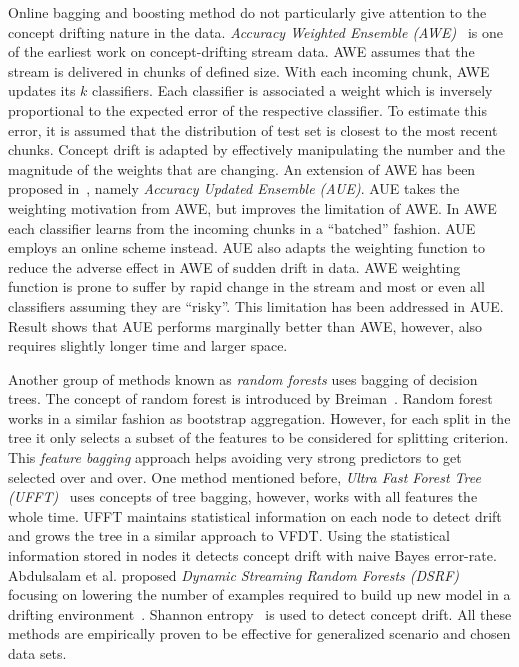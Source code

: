 
Online bagging and boosting method do not particularly give attention to the concept drifting nature in the data. \textit{Accuracy Weighted Ensemble (AWE)}~\cite{wang03:accuweighted} is one of the earliest work on concept-drifting stream data. AWE assumes that the stream is delivered in chunks of defined size. With each incoming chunk, AWE updates its $k$ classifiers. Each classifier is associated a weight which is inversely proportional to the expected error of the respective classifier. To estimate this error, it is assumed that the distribution of test set is closest to the most recent chunks. Concept drift is adapted by effectively manipulating the number and the magnitude of the weights that are changing. An extension of AWE has been proposed in~\cite{brzezinski11:accuupdated}, namely \textit{Accuracy Updated Ensemble (AUE)}. AUE takes the weighting motivation from AWE, but improves the limitation of AWE. In AWE each classifier learns from the incoming chunks in a ``batched'' fashion. AUE employs an online scheme instead. AUE also adapts the weighting function to reduce the adverse effect in AWE of sudden drift in data. AWE weighting function is prone to suffer by rapid change in the stream and most or even all classifiers assuming they are ``risky''. This limitation has been addressed in AUE. Result shows that AUE performs marginally better than AWE, however, also requires slightly longer time and larger space.


Another group of methods known as \textit{random forests} uses bagging of decision trees. The concept of random forest is introduced by Breiman~\cite{breiman99:randomforest}. Random forest works in a similar fashion as bootstrap aggregation. However, for each split in the tree it only selects a subset of the features to be considered for splitting criterion. This \textit{feature bagging} approach helps avoiding very strong predictors to get selected over and over. One method mentioned before, \textit{Ultra Fast Forest Tree (UFFT)}~\cite{gama04:ft, gama05:ft} uses concepts of tree bagging, however, works with all features the whole time. UFFT maintains statistical information on each node to detect drift and grows the tree in a similar  approach to VFDT. Using the statistical information stored in nodes it detects concept drift with naive Bayes error-rate. Abdulsalam et al. proposed \textit{Dynamic Streaming Random Forests (DSRF)} focusing on lowering the number of examples required to build up new model in a drifting environment~\cite{salam08:dsrf, salam11:dsrf}. Shannon entropy~\cite{shannon01:entropy} is used to detect concept drift. All these methods are empirically proven to be effective for generalized scenario and chosen data sets. 


